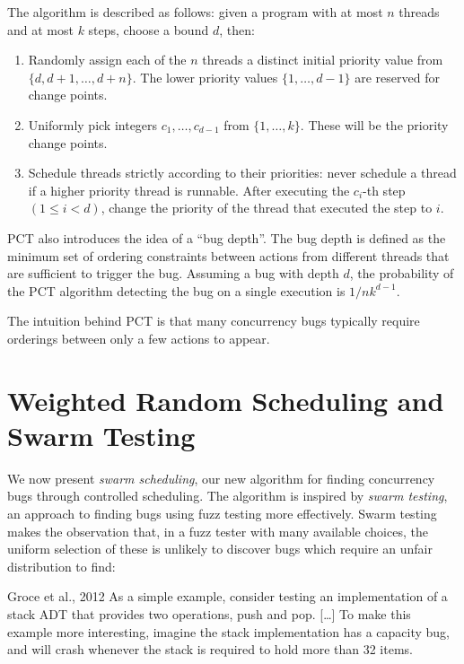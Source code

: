 The algorithm is described as follows\cite{burckhardt2010}: given a program with
at most $n$ threads and at most $k$ steps, choose a bound $d$, then:

\begin{enumerate}
\item Randomly assign each of the $n$ threads a distinct initial priority value
  from $\{d, d + 1, \ldots, d+n\}$.  The lower priority values
  $\{1, \ldots, d−1\}$ are reserved for change points.
\item Uniformly pick integers $c_1, \ldots, c_{d−1}$ from $\{1, \ldots, k\}$.
  These will be the priority change points.
\item Schedule threads strictly according to their priorities: never schedule a
  thread if a higher priority thread is runnable.  After executing the $c_i$-th
  step $(1 \leq i < d)$, change the priority of the thread that executed the
  step to $i$.
\end{enumerate}

PCT also introduces the idea of a ``bug depth''.  The bug depth is defined as
the minimum set of ordering constraints between actions from different threads
that are sufficient to trigger the bug\cite{burckhardt2010}.  Assuming a bug
with depth $d$, the probability of the PCT algorithm detecting the bug on a
single execution is $1/nk^{d−1}$.

The intuition behind PCT is that many concurrency bugs typically require
orderings between only a few actions to appear.

\section{Weighted Random Scheduling and Swarm Testing}
\label{sec:algorithms-swarm}

We now present \emph{swarm scheduling}, our new algorithm for finding
concurrency bugs through controlled scheduling.  The algorithm is inspired by
\emph{swarm testing}\cite{groce2012}, an approach to finding bugs using fuzz
testing more effectively.  Swarm testing makes the observation that, in a fuzz
tester with many available choices, the uniform selection of these is unlikely
to discover bugs which require an unfair distribution to find:

\begin{bquote}{Groce et al., 2012\nocite{groce2012}}
  As a simple example, consider testing an implementation of a stack ADT that
  provides two operations, push and pop. [\ldots] To make this example more
  interesting, imagine the stack implementation has a capacity bug, and will
  crash whenever the stack is required to hold more than 32
  items.\cite{groce2012}
\end{bquote}

